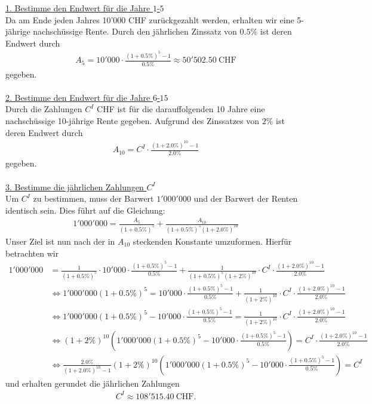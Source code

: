 \underline{1. Bestimme den Endwert für die Jahre $ 1 $-$ 5 $}\\
Da am Ende jeden Jahres 10'000 CHF zurückgezahlt werden, erhalten wir eine 5-jährige nachschüssige Rente. Durch den jährlichen Zinssatz von $0.5 \%$ ist deren Endwert durch
\begin{align*}
A_5 = 10'000 \cdot \frac{(1+ 0.5 \%)^5 -1 }{0.5 \%} \approx 50'502.50 \ \text{CHF}
\end{align*}
gegeben.
\\
\\
\underline{2. Bestimme den Endwert für die Jahre $ 6 $-$ 15 $}\\
Durch die Zahlungen $C^I$ CHF ist für die darauffolgenden 10 Jahre eine nachschüssige 10-jährige Rente gegeben. Aufgrund des Zinssatzes von $2 \%$ ist deren Endwert durch
\begin{align*}
A_{10} = C^I \cdot \frac{(1+ 2.0 \%)^{10} -1}{2.0 \%}
\end{align*}
gegeben.
\\
\\
\newpage
\underline{3. Bestimme die jährlichen Zahlungen $ C^I $}\\
Um $ C^I $ zu bestimmen, muss der Barwert $ 1'000'000 $ und der Barwert der Renten identisch sein. Dies führt auf die Gleichung:
\begin{align*}
1'000'000 = 
\frac{A_5}{(1+ 0.5 \%)^5} +
\frac{A_{10}}{(1+ 0.5 \%)^5(1+2.0 \%)^{10}}
\end{align*}
Unser Ziel ist nun nach der in $A_{10}$ steckenden Konstante umzuformen. Hierfür betrachten wir
\begin{align*}
1'000'000
&= \frac{1}{(1+ 0.5 \%)^5} \cdot 
10'000 \cdot \frac{(1+ 0.5 \%)^5 -1 }{0.5 \%}
+ 
\frac{1}{(1+ 0.5 \%)^5 (1 + 2 \%)^{10}} \cdot 
C^I \cdot \frac{(1+ 2.0 \%)^{10} -1}{2.0 \%}\\
&\Leftrightarrow
1'000'000 (1+ 0.5 \%)^5
=
10'000 \cdot \frac{(1+ 0.5 \%)^5 -1 }{0.5 \%}
+
\frac{1}{(1 + 2 \%)^{10}} \cdot C^I \cdot \frac{(1+ 2.0 \%)^{10} -1}{2.0 \%}\\
&\Leftrightarrow
1'000'000 (1+ 0.5 \%)^5 - 10'000 \cdot \frac{(1+ 0.5 \%)^5 -1 }{0.5 \%} 
=
\frac{1}{(1 + 2 \%)^{10}} \cdot C^I \cdot \frac{(1+ 2.0 \%)^{10} -1}{2.0 \%}\\
&\Leftrightarrow 
(1 + 2 \%)^{10} \left(  1'000'000 (1+ 0.5 \%)^5 - 10'000 \cdot \frac{(1+ 0.5 \%)^5 -1 }{0.5 \%} \right)
=
C^I \cdot \frac{(1+ 2.0 \%)^{10} -1}{2.0 \%}\\
&\Leftrightarrow
\frac{2.0 \%}{(1+ 2.0 \%)^{10} -1}(1 + 2 \%)^{10} \left(  1'000'000 (1+ 0.5 \%)^5 - 10'000 \cdot \frac{(1+ 0.5 \%)^5 -1 }{0.5 \%} \right) = C^I
\end{align*} 
und erhalten gerundet die jährlichen Zahlungen
\begin{align*}
C^I \approx 108'515.40 \ \text{CHF}.
\end{align*}


